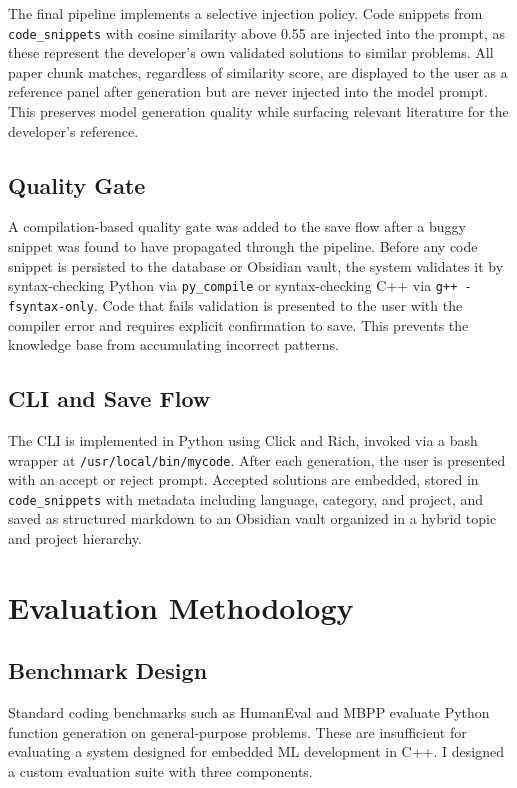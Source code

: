 \documentclass[11pt,twocolumn]{article}
\begin{document}
The final pipeline implements a selective injection policy. Code snippets from
\texttt{code\_snippets} with cosine similarity above 0.55 are injected into
the prompt, as these represent the developer's own validated solutions to
similar problems. All paper chunk matches, regardless of similarity score, are
displayed to the user as a reference panel after generation but are never
injected into the model prompt. This preserves model generation quality while
surfacing relevant literature for the developer's reference.

\subsection{Quality Gate}

A compilation-based quality gate was added to the save flow after a buggy
snippet was found to have propagated through the pipeline. Before any code
snippet is persisted to the database or Obsidian vault, the system validates
it by syntax-checking Python via \texttt{py\_compile} or syntax-checking C++
via \texttt{g++ -fsyntax-only}. Code that fails validation is presented to
the user with the compiler error and requires explicit confirmation to save.
This prevents the knowledge base from accumulating incorrect patterns.

\subsection{CLI and Save Flow}

The CLI is implemented in Python using Click and Rich, invoked via a bash
wrapper at \texttt{/usr/local/bin/mycode}. After each generation, the user
is presented with an accept or reject prompt. Accepted solutions are embedded,
stored in \texttt{code\_snippets} with metadata including language, category,
and project, and saved as structured markdown to an Obsidian vault organized
in a hybrid topic and project hierarchy.

\section{Evaluation Methodology}

\subsection{Benchmark Design}

Standard coding benchmarks such as HumanEval and MBPP evaluate Python
function generation on general-purpose problems. These are insufficient for
evaluating a system designed for embedded ML development in C++. I designed
a custom evaluation suite with three components.
\end{document}
